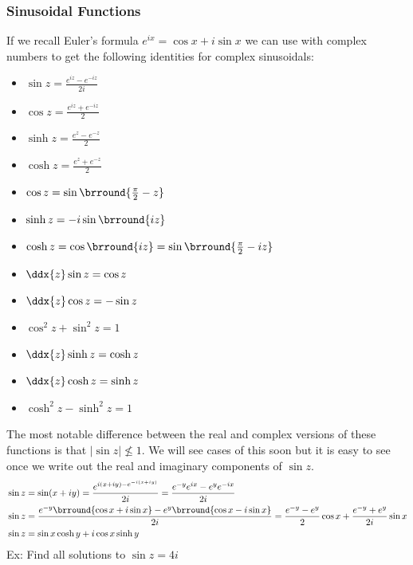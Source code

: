 \subsubsection{Sinusoidal Functions}
If we recall Euler's formula $e^{ix}=\cos x+i\sin x$ we can use with complex numbers to get the following identities for complex sinusoidals:
\begin{itemize}
    \item $\sin z=\frac{e^{iz}-e^{-iz}}{2i}$
    \item $\cos z=\frac{e^{iz}+e^{-iz}}{2}$
    \item $\sinh z=\frac{e^z-e^{-z}}{2}$
    \item $\cosh z=\frac{e^z+e^{-z}}{2}$
    \item $\cos z=\sin\brround{\tfrac{\pi}{2}-z}$
    \item $\sinh z=-i\sin\brround{iz}$
    \item $\cosh z=\cos\brround{iz}=\sin\brround{\tfrac{\pi}{2}-iz}$
    \item $\ddx{z}\sin z=\cos z$
    \item $\ddx{z}\cos z=-\sin z$
    \item $\cos^2z+\sin^2z=1$
    \item $\ddx{z}\sinh z=\cosh z$
    \item $\ddx{z}\cosh z=\sinh z$
    \item $\cosh^2z-\sinh^2z=1$
\end{itemize}
The most notable difference between the real and complex versions of these functions is that $|\sin z|\not\leq1$. We will see cases of this soon but it is easy to see once we write out the real and imaginary components of $\sin z$.
\begin{align*}
    &\sin z=\sin(x+iy)=\frac{e^{i(x+iy)-e^{-i(x+iy)}}}{2i}=\frac{e^{-y}e^{ix}-e^ye^{-ix}}{2i}\\
    &\sin z = \frac{e^{-y}\brround{\cos x+i\sin x}-e^y\brround{\cos x-i\sin x}}{2i}=\frac{e^{-y}-e^y}{2}\cos x+\frac{e^{-y}+e^y}{2i}\sin x\\
    &\sin z = \sin x\cosh y+i\cos x\sinh y
\end{align*}
Ex: Find all solutions to $\sin z=4i$
